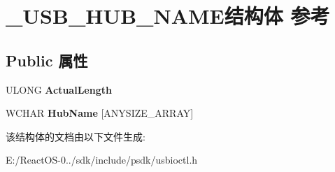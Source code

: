 \hypertarget{struct___u_s_b___h_u_b___n_a_m_e}{}\section{\+\_\+\+U\+S\+B\+\_\+\+H\+U\+B\+\_\+\+N\+A\+M\+E结构体 参考}
\label{struct___u_s_b___h_u_b___n_a_m_e}
\subsection*{Public 属性}
\begin{DoxyCompactItemize}
\item 
\mbox{\label{struct___u_s_b___h_u_b___n_a_m_e_abb1e09d73bc99a31a4af8f26387d4930}} 
U\+L\+O\+NG {\bfseries Actual\+Length}
\item 
\mbox{\label{struct___u_s_b___h_u_b___n_a_m_e_ab66ed61954190374a2e46fba88acf086}} 
W\+C\+H\+AR {\bfseries Hub\+Name} \mbox{[}A\+N\+Y\+S\+I\+Z\+E\+\_\+\+A\+R\+R\+AY\mbox{]}
\end{DoxyCompactItemize}


该结构体的文档由以下文件生成\+:\begin{DoxyCompactItemize}
\item 
E\+:/\+React\+O\+S-\/0../sdk/include/psdk/usbioctl.\+h\end{DoxyCompactItemize}
